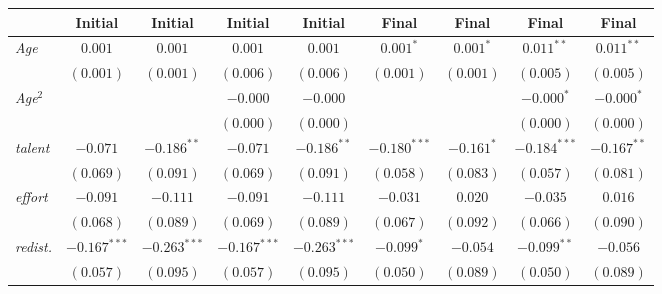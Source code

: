 
\begin{table}[htpb]
\begin{center}
\begin{footnotesize}
\begin{threeparttable}
\setlength{\tabcolsep}{.62\tabcolsep}
\begin{tabular}{l c c c c c c c c}
\toprule
 & Initial & Initial & Initial & Initial & Final & Final & Final & Final \\
\midrule
\textit{Age}                            & $0.001$        & $0.001$        & $0.001$        & $0.001$        & $0.001^{*}$    & $0.001^{*}$    & $0.011^{**}$   & $0.011^{**}$   \\
                                        & $(0.001)$      & $(0.001)$      & $(0.006)$      & $(0.006)$      & $(0.001)$      & $(0.001)$      & $(0.005)$      & $(0.005)$      \\
\textit{Age}$^2$                        &                &                & $-0.000$       & $-0.000$       &                &                & $-0.000^{*}$   & $-0.000^{*}$   \\
                                        &                &                & $(0.000)$      & $(0.000)$      &                &                & $(0.000)$      & $(0.000)$      \\
\textit{talent}                         & $-0.071$       & $-0.186^{**}$  & $-0.071$       & $-0.186^{**}$  & $-0.180^{***}$ & $-0.161^{*}$   & $-0.184^{***}$ & $-0.167^{**}$  \\
                                        & $(0.069)$      & $(0.091)$      & $(0.069)$      & $(0.091)$      & $(0.058)$      & $(0.083)$      & $(0.057)$      & $(0.081)$      \\
\textit{effort}                         & $-0.091$       & $-0.111$       & $-0.091$       & $-0.111$       & $-0.031$       & $0.020$        & $-0.035$       & $0.016$        \\
                                        & $(0.068)$      & $(0.089)$      & $(0.069)$      & $(0.089)$      & $(0.067)$      & $(0.092)$      & $(0.066)$      & $(0.090)$      \\
\textit{redist.}                        & $-0.167^{***}$ & $-0.263^{***}$ & $-0.167^{***}$ & $-0.263^{***}$ & $-0.099^{*}$   & $-0.054$       & $-0.099^{**}$  & $-0.056$       \\
                                        & $(0.057)$      & $(0.095)$      & $(0.057)$      & $(0.095)$      & $(0.050)$      & $(0.089)$      & $(0.050)$      & $(0.089)$      \\

\end{tabular}
\end{threeparttable}
\end{footnotesize}
\end{center}
\end{table}
